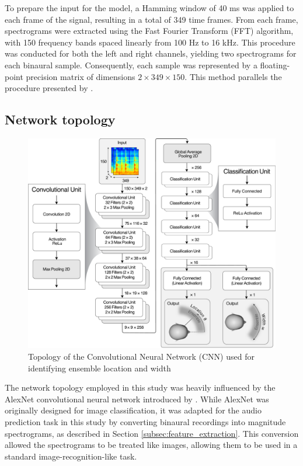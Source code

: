 \documentclass{article}
\begin{document}
To prepare the input for the model, a Hamming window of 40 ms was applied to each frame of the signal, resulting in a total of 349 time frames. From each frame, spectrograms were extracted using the Fast Fourier Transform (FFT) algorithm, with 150 frequency bands spaced linearly from 100 Hz to 16 kHz. This procedure was conducted for both the left and right channels, yielding two spectrograms for each binaural sample. Consequently, each sample was represented by a floating-point precision matrix of dimensions $2 \times 349 \times 150$. This method parallels the procedure presented by \cite{zielinski_automatic_2022}.

\subsection{Network topology}
\label{subsec:topology}

\begin{figure}[ht]
  \centering
  \includegraphics[width=\linewidth]{../pictures/architecture.pdf}
  \caption{\label{fig:architecture}Topology of the Convolutional Neural Network (CNN) used for identifying ensemble location and width}
\end{figure}

The network topology employed in this study was heavily influenced by the AlexNet convolutional neural network introduced by \cite{krizhevsky_imagenet_2012}. While AlexNet was originally designed for image classification, it was adapted for the audio prediction task in this study by converting binaural recordings into magnitude spectrograms, as described in Section \ref{subsec:feature_extraction}. This conversion allowed the spectrograms to be treated like images, allowing them to be used in a standard image-recognition-like task.
\end{document}
